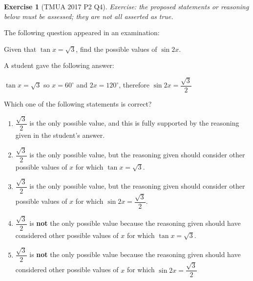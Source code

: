 \documentclass[11pt]{article}
\theoremstyle{definition}
\newtheorem{example}[theorem]{Exercise}
\theoremstyle{remark}
\newcommand{\degree}{^{\circ}}
\begin{document}
\begin{example}[TMUA 2017 P2 Q4]\label{tmua-2-unit-025}
\textit{Exercise: the proposed statements or reasoning below must be assessed; they are not all asserted as true.}\par

    The following question appeared in an examination:

    \indent Given that \(\tan x = \sqrt{3}\), find the possible values of \(\sin 2x\).

    A student gave the following answer:

    \indent \(\tan x = \sqrt{3}\) so \(x = 60 \degree\) and \(2x = 120 \degree\), therefore \(\sin 2x = \dfrac{\sqrt{3}}{2}\)

    Which one of the following statements is correct?

    \begin{enumerate}
        \item \(\dfrac{\sqrt{3}}{2}\) is the only possible value, and this is fully supported by the reasoning given in the student's answer.
        \item \(\dfrac{\sqrt{3}}{2}\) is the only possible value, but the reasoning given should consider other possible values of \(x\) for which \(\tan x = \sqrt{3}\).
        \item \(\dfrac{\sqrt{3}}{2}\) is the only possible value, but the reasoning given should consider other possible values of \(x\) for which \(\sin 2x = \dfrac{\sqrt{3}}{2}\).
        \item \(\dfrac{\sqrt{3}}{2}\) is \textbf{not} the only possible value because the reasoning given should have considered other possible values of \(x\) for which \(\tan x = \sqrt{3}\).
        \item \(\dfrac{\sqrt{3}}{2}\) is \textbf{not} the only possible value because the reasoning given should have considered other possible values of \(x\) for which \(\sin 2x = \dfrac{\sqrt{3}}{2}\)
    \end{enumerate}
\end{example}
\end{document}
